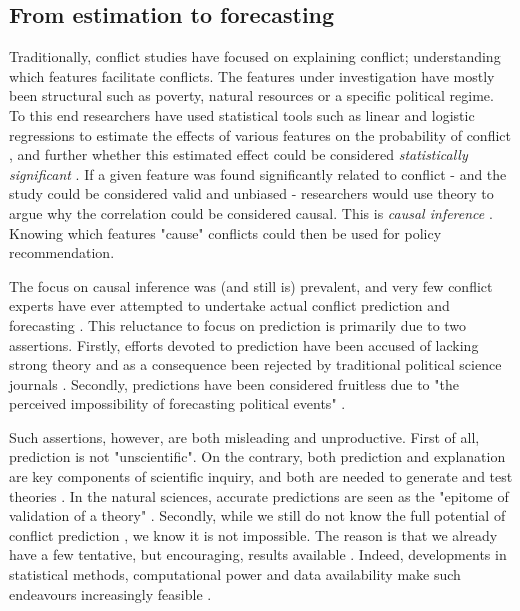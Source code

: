 \documentclass[a4paper]{article}
\begin{document}
\subsection{From estimation to forecasting}\label{est_to_pred} %

Traditionally, conflict studies have focused on explaining conflict; understanding which features facilitate conflicts. The features under investigation have mostly been structural such as poverty, natural resources or a specific political regime. To this end researchers have used statistical tools such as linear and logistic regressions to estimate the effects of various features on the probability of conflict \citep[8]{chadefaux2017conflict}, and further whether this estimated effect could be considered \emph{statistically significant} \citep[363-364]{Ward_Greenhill_Bakke_2010}. If a given feature was found significantly related to conflict - and the study could be considered valid and unbiased - researchers would use theory to argue why the correlation could be considered causal. This is \emph{causal inference} \citep[8]{chadefaux2017conflict}. Knowing which features "cause" conflicts could then be used for policy recommendation.\par

The focus on causal inference was (and still is) prevalent, and very few conflict experts have ever attempted to undertake actual conflict prediction and forecasting \citep[474]{cederman2017predicting}. This reluctance to focus on prediction is primarily due to two assertions. Firstly, efforts devoted to prediction have been accused of lacking strong theory and as a consequence been rejected by traditional political science journals \citep[8-9]{chadefaux2017conflict}. Secondly, predictions have been considered fruitless due to "the perceived impossibility of forecasting political events" \citep[8]{chadefaux2017conflict}.

Such assertions, however, are both misleading and unproductive. First of all, prediction is not "unscientific". On the contrary, both prediction and explanation are key components of scientific inquiry, and both are needed to generate and test theories \citep[8]{chadefaux2017conflict}. In the natural sciences, accurate predictions are seen as the "epitome of validation of a theory" \citep[289]{Schrodt_2014}. Secondly, while we still do not know the full potential of conflict prediction \citep{cederman2017predicting, chadefaux2017conflict}, we know it is not impossible. The reason is that we already have a few tentative, but encouraging, results available \citep{Goldstone_2010, perry_2013, mueller_2016, Maase}. Indeed, developments in statistical methods, computational power and data availability make such endeavours increasingly feasible \citep{ol2010afghanistan, perry_2013}. 
\end{document}
